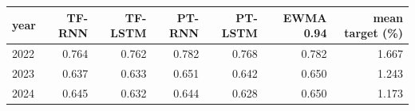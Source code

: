 \begin{tabular}{lrrrrrr}
\toprule
year & TF-RNN & TF-LSTM & PT-RNN & PT-LSTM & EWMA 0.94 & mean target (\%) \\
\midrule
2022 & 0.764 & 0.762 & 0.782 & 0.768 & 0.782 & 1.667 \\
2023 & 0.637 & 0.633 & 0.651 & 0.642 & 0.650 & 1.243 \\
2024 & 0.645 & 0.632 & 0.644 & 0.628 & 0.650 & 1.173 \\
\bottomrule
\end{tabular}